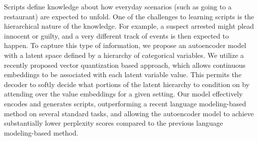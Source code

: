 Scripts define knowledge about how everyday scenarios (such as going to a restaurant) are expected to unfold. One of the challenges to learning scripts is the hierarchical nature of the knowledge. For example, a suspect arrested might plead innocent or guilty, and a very different track of events is then expected to happen. To capture this type of information, we propose an autoencoder model with a latent space defined by a hierarchy of categorical variables. We utilize a recently proposed vector quantization based approach, which allows continuous embeddings to be associated with each latent variable value. This permits the decoder to softly decide what portions of the latent hierarchy to condition on by attending over the value embeddings for a given setting. Our model effectively encodes and generates scripts, outperforming a recent language modeling-based method on several standard tasks, and allowing the autoencoder model to achieve substantially lower perplexity scores compared to the previous language modeling-based method.
